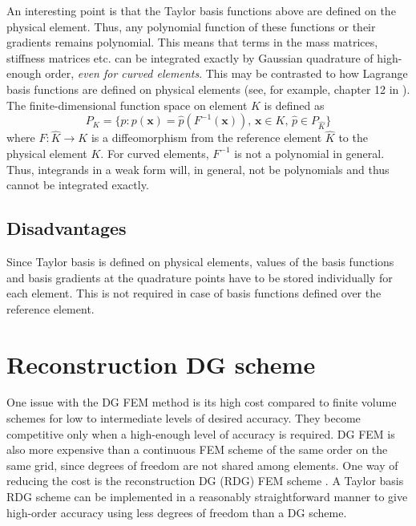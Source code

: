\documentclass[11pt]{article}
\let\bld\boldsymbol
\begin{document}
An interesting point is that the Taylor basis functions above are defined on the physical element. Thus, any polynomial function of these functions or their gradients remains polynomial. This means that terms in the mass matrices, stiffness matrices etc. can be integrated exactly by Gaussian quadrature of high-enough order, \emph{even for curved elements}. This may be contrasted to how Lagrange basis functions are defined on physical elements (see, for example, chapter 12 in \cite{claesjohnson}). The finite-dimensional function space on element $K$ is defined as
\begin{equation}
P_K = \{ p: p(\bld{x}) = \hat{p}(F^{-1}(\bld{x})),\, \bld{x} \in K,\, \hat{p} \in P_{\hat{K}} \}
\end{equation}
where $F:\hat{K}\rightarrow K$ is a diffeomorphism from the reference element $\hat{K}$ to the physical element $K$. For curved elements, $F^{-1}$ is not a polynomial in general. Thus, integrands in a weak form will, in general, not be polynomials and thus cannot be integrated exactly.

\subsection{Disadvantages}

Since Taylor basis is defined on physical elements, values of the basis functions and basis gradients at the quadrature points have to be stored individually for each element. This is not required in case of basis functions defined over the reference element.

\section{Reconstruction DG scheme}
One issue with the DG FEM method is its high cost compared to finite volume schemes for low to intermediate levels of desired accuracy. They become competitive only when a high-enough level of accuracy is required. DG FEM is also more expensive than a continuous FEM scheme of the same order on the same grid, since degrees of freedom are not shared among elements. One way of reducing the cost is the reconstruction DG (RDG) FEM scheme \cite{luo_rdg}. A Taylor basis RDG scheme can be implemented in a reasonably straightforward manner to give high-order accuracy using less degrees of freedom than a DG scheme.
\end{document}

